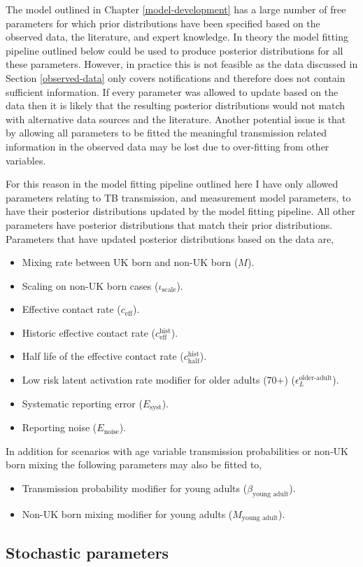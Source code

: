 \documentclass[11pt,twoside]{bristolthesis}
\providecommand{\tightlist}{%
  \setlength{\itemsep}{0pt}\setlength{\parskip}{0pt}}
\begin{document}
  The model outlined in Chapter \ref{model-development} has a large number of free parameters for which prior distributions have been specified based on the observed data, the literature, and expert knowledge. In theory the model fitting pipeline outlined below could be used to produce posterior distributions for all these parameters. However, in practice this is not feasible as the data discussed in Section \ref{observed-data} only covers notifications and therefore does not contain sufficient information. If every parameter was allowed to update based on the data then it is likely that the resulting posterior distributions would not match with alternative data sources and the literature. Another potential issue is that by allowing all parameters to be fitted the meaningful transmission related information in the observed data may be lost due to over-fitting from other variables.
  
  For this reason in the model fitting pipeline outlined here I have only allowed parameters relating to TB transmission, and measurement model parameters, to have their posterior distributions updated by the model fitting pipeline. All other parameters have posterior distributions that match their prior distributions. Parameters that have updated posterior distributions based on the data are,
  \begin{itemize}
  \tightlist
  \item
    Mixing rate between UK born and non-UK born (\(M\)).
  \item
    Scaling on non-UK born cases (\(\iota_{\text{scale}}\)).
  \item
    Effective contact rate (\(c_{\text{eff}}\)).
  \item
    Historic effective contact rate (\(c^{\text{hist}}_{\text{eff}}\)).
  \item
    Half life of the effective contact rate (\(c^{\text{hist}}_{\text{half}}\)).
  \item
    Low risk latent activation rate modifier for older adults (70+) (\(\epsilon^{\text{older-adult}}_L\)).
  \item
    Systematic reporting error (\(E_{\text{syst}}\)).
  \item
    Reporting noise (\(E_{\text{noise}}\)).
  \end{itemize}
  In addition for scenarios with age variable transmission probabilities or non-UK born mixing the following parameters may also be fitted to,
  \begin{itemize}
  \tightlist
  \item
    Transmission probability modifier for young adults (\(\beta_{\text{young adult}}\)).
  \item
    Non-UK born mixing modifier for young adults (\(M_{\text{young adult}}\)).
  \end{itemize}
  \hypertarget{stochastic-parameters}{%
  \subsection{Stochastic parameters}\label{stochastic-parameters}}
  
\end{document}
